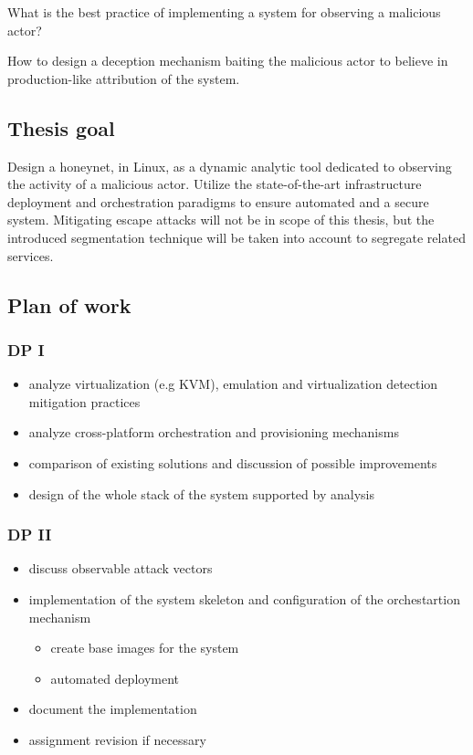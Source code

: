 \documentclass[12pt,a4paper,twoside]{report}
\begin{document}
What is the best practice of implementing a system for observing a malicious actor?

How to design a deception mechanism baiting the malicious actor to believe in production-like attribution of the system.

\subsection{Thesis goal}\label{thesis-goal}

Design a honeynet, in Linux, as a dynamic analytic tool dedicated to observing the activity of a malicious actor. Utilize the state-of-the-art infrastructure deployment and orchestration paradigms to ensure automated and a secure system. Mitigating escape attacks will not be in scope of this thesis, but the introduced segmentation technique will be taken into account to segregate related services.

\subsection{Plan of work}\label{plan-of-work}

\subsubsection{DP I}\label{dp-i}

\begin{itemize}
\item
  analyze virtualization (e.g KVM), emulation and virtualization detection mitigation practices
\item
  analyze cross-platform orchestration and provisioning mechanisms
\item
  comparison of existing solutions and discussion of possible improvements
\item
  design of the whole stack of the system supported by analysis
\end{itemize}

\subsubsection{DP II}\label{dp-ii}

\begin{itemize}
\item
  discuss observable attack vectors
\item
  implementation of the system skeleton and configuration of the orchestartion mechanism

  \begin{itemize}
  \item
    create base images for the system
  \item
    automated deployment
  \end{itemize}
\item
  document the implementation
\item
  assignment revision if necessary
\end{itemize}
\end{document}
